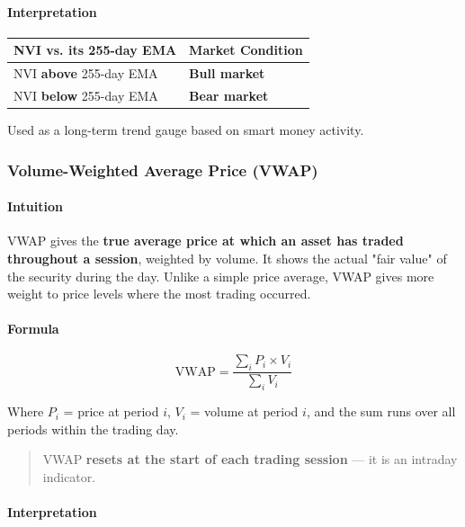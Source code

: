 \documentclass[12pt,openany]{book}
\begin{document}
\paragraph{Interpretation}

\begin{center}
\small
\renewcommand{\arraystretch}{1.2}
\begin{tabular}{|L{0.30\textwidth}|L{0.60\textwidth}|}
\hline
 \textbf{NVI vs. its 255-day EMA} & \textbf{Market Condition} \\ \hline
 NVI \textbf{above} 255-day EMA & \textbf{Bull market} \\ \hline
 NVI \textbf{below} 255-day EMA & \textbf{Bear market} \\ \hline
\end{tabular}
\end{center}

Used as a long-term trend gauge based on smart money activity.

\subsubsection{Volume-Weighted Average Price (VWAP)}

\paragraph{Intuition}
VWAP gives the \textbf{true average price at which an asset has traded throughout a session}, weighted by volume. It shows the actual "fair value" of the security during the day. Unlike a simple price average, VWAP gives more weight to price levels where the most trading occurred.

\paragraph{Formula}

\[
\text{VWAP} = \frac{\sum_{i} P_i \times V_i}{\sum_{i} V_i}
\]

Where \(P_i\) = price at period \(i\), \(V_i\) = volume at period \(i\), and the sum runs over all periods within the trading day.

\begin{quote}
VWAP \textbf{resets at the start of each trading session} --- it is an intraday indicator.

\end{quote}
\paragraph{Interpretation}
\end{document}
